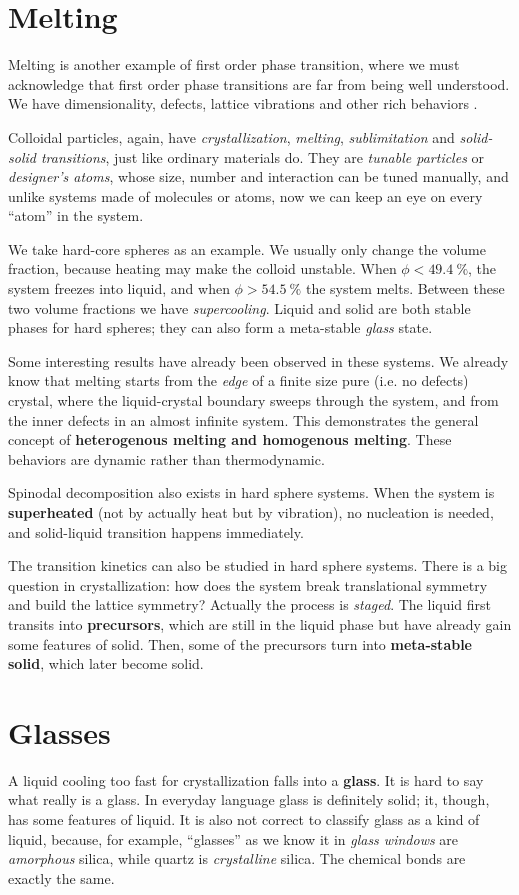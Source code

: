 \documentclass[hyperref, a4paper]{article}
\newcommand*{\concept}[1]{{\textbf{#1}}}
\begin{document}
\section{Melting}

Melting is another example of first order phase transition, where we must acknowledge that first order phase transitions are far from being well understood.
We have dimensionality, defects, lattice vibrations and other rich behaviors .

Colloidal particles, again, have \emph{crystallization}, \emph{melting}, \emph{sublimitation} and \emph{solid-solid transitions}, just like ordinary materials do.
They are \emph{tunable particles} or \emph{designer's atoms}, whose size, number and interaction can be tuned manually, and unlike systems made of molecules or atoms, now we can keep an eye on every ``atom'' in the system.

We take hard-core spheres as an example. We usually only change the volume fraction, because heating may make the colloid unstable.
When $\phi < \SI{49.4}{\percent}$, the system freezes into liquid, and when $\phi > \SI{54.5}{\percent}$ the system melts.
Between these two volume fractions we have \emph{supercooling}.
Liquid and solid are both stable phases for hard spheres; they can also form a meta-stable \emph{glass} state.

Some interesting results have already been observed in these systems. We already know that melting starts from the \emph{edge} of a finite size pure (i.e. no defects) crystal, where the liquid-crystal boundary sweeps through the system, and from the inner defects in an almost infinite system.
This demonstrates the general concept of \concept{heterogenous melting and homogenous melting}.
These behaviors are dynamic rather than thermodynamic.

Spinodal decomposition also exists in hard sphere systems. When the system is \concept{superheated} (not by actually heat but by vibration), no nucleation is needed, and solid-liquid transition happens immediately.

The transition kinetics can also be studied in hard sphere systems. There is a big question in crystallization:
how does the system break translational symmetry and build the lattice symmetry?
Actually the process is \emph{staged}. The liquid first transits into \concept{precursors}, which are still in the liquid phase but have already gain some features of solid.
Then, some of the precursors turn into \concept{meta-stable solid}, which later become solid.

\section{Glasses}

A liquid cooling too fast for crystallization falls into a \concept{glass}. 
It is hard to say what really is a glass. 
In everyday language glass is definitely solid; it, though, has some features of liquid.
It is also not correct to classify glass as a kind of liquid, because, for example, ``glasses'' as we know it in \emph{glass windows} are \emph{amorphous} silica, while quartz is \emph{crystalline} silica.
The chemical bonds are exactly the same.
\end{document}
